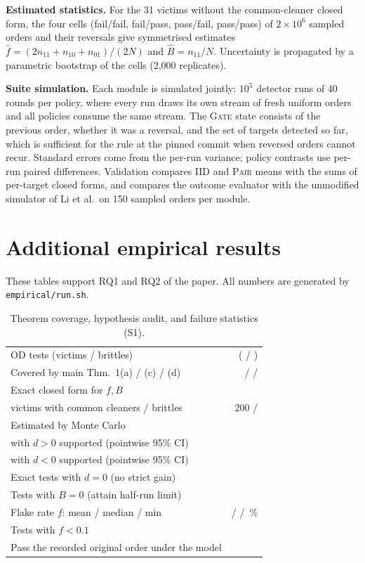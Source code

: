 \documentclass[11pt,a4paper]{article}
\theoremstyle{definition}\newtheorem{definition}[theorem]{Definition}
\theoremstyle{remark}\newtheorem{remark}[theorem]{Remark}
\theoremstyle{definition}\newtheorem{xexample}[xtheorem]{Example}\theoremstyle{plain}
\begin{document}
\textbf{Estimated statistics.} For the 31 victims without the common-cleaner closed form, the four cells (fail/fail, fail/pass, pass/fail, pass/pass) of $2\times10^6$ sampled orders and their reversals give symmetrised estimates $\hat f=(2n_{11}+n_{10}+n_{01})/(2N)$ and $\hat B=n_{11}/N$. Uncertainty is propagated by a parametric bootstrap of the cells (2{,}000 replicates).

\textbf{Suite simulation.} Each module is simulated jointly: $10^5$ detector runs of 40 rounds per policy, where every run draws its own stream of fresh uniform orders and all policies consume the same stream. The \textsc{Gate} state consists of the previous order, whether it was a reversal, and the set of targets detected so far, which is sufficient for the rule at the pinned commit when reversed orders cannot recur. Standard errors come from the per-run variance; policy contrasts use per-run paired differences. Validation compares \textsc{IID} and \textsc{Pair} means with the sums of per-target closed forms, and compares the outcome evaluator with the unmodified simulator of Li et al.\ on 150 sampled orders per module.

\section{Additional empirical results}\label{sec:moretables}
These tables support RQ1 and RQ2 of the paper. All numbers are generated by \texttt{empirical/run.sh}.

\begin{table}[h]
\centering\small
\caption{Theorem coverage, hypothesis audit, and failure statistics (S1).}\label{tab:s-audit}
\begin{tabular}{@{}lr@{}}
\toprule
OD tests (victims / brittles) & \NTargets{} (\NVictims{} / \NBrittles{})\\
Covered by main Thm.~1(a) / (c) / (d) & \CovThmOne{} / \CovThmThree{} / \CovThmFour{}\\
Exact closed form for $f,B$ & \NExact{}\\
\quad victims with common cleaners / brittles & 200 / \NBrittles{}\\
Estimated by Monte Carlo & \NMC{}\\
\quad with $d>0$ supported (pointwise 95\% CI) & \NMCneg{}\\
\quad with $d<0$ supported (pointwise 95\% CI) & \NMCpos{}\\
Exact tests with $d=0$ (no strict gain) & \NZeroGap{}\\
Tests with $B=0$ (attain half-run limit) & \NBzero{}\\
Flake rate $f$: mean / median / min & \FMean{} / \FMedian{} / \FMin{}\,\%\\
Tests with $f<0.1$ & \NflowTen{}\\
Pass the recorded original order under the model & \NConsistent{}\\
\bottomrule
\end{tabular}
\end{table}
\end{document}
